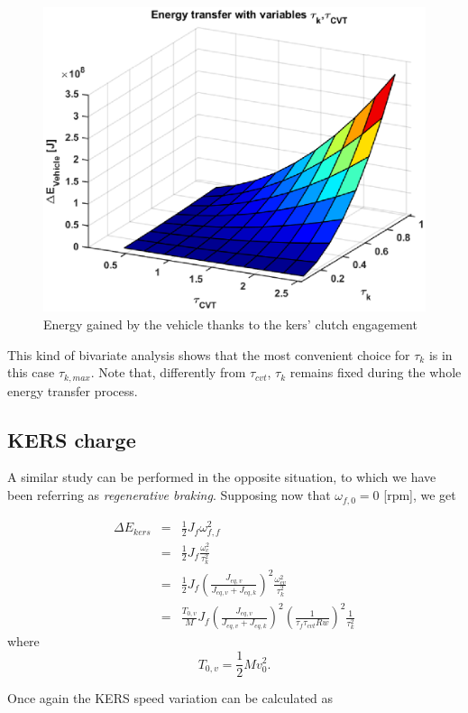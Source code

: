 \documentclass[11pt]{article}
\begin{document}
\begin{figure}[H]
\captionsetup{font=small, justification=centering}
\centering
\includegraphics[width=.55\textwidth]{Images/Results_new/Univariate_SteadyState/en_comp_acc_3D.eps}
\caption{Energy gained by the vehicle thanks to the kers' clutch engagement}
\label{en_comp_acc_3D}
\end{figure}    

This kind of bivariate analysis shows that the most convenient choice for $\tau_k$ is in this case $\tau_{k,max}$. Note that, differently from $\tau_{cvt}$, $\tau_k$ remains fixed during the whole energy transfer process.

\subsection{KERS charge}

A similar study can be performed in the opposite situation, to which we have been referring as \textit{regenerative braking}. Supposing now that $\omega_{f,0}=0$ [rpm], we get

\begin{eqnarray}
\Delta E_{kers}&=&\frac{1}{2}J_f\omega_{f,f}^2\\
               &=&\frac{1}{2}J_f\frac{\omega_{c}^2}{\tau_k^2}\\
               &=&\frac{1}{2}J_f\left(\frac{J_{eq,v}}{J_{eq,v}+J_{eq,k}}					          \right)^2\frac{\omega_{cv}^2}{\tau_k^2}\\               
               &=&\frac{T_{0,v}}{M}J_f\left(\frac{J_{eq,v}}{J_{eq,v}+J_{eq,k}}					     \right)^2\left(\frac{1}{\tau_f \tau_{cvt}Rw}\right)^2\frac{1}    						 {\tau_k^2} 
\end{eqnarray}
where
\begin{equation}
T_{0,v} = \frac{1}{2}Mv_0^2.
\end{equation} 

Once again the KERS speed variation can be calculated as 
\end{document}
